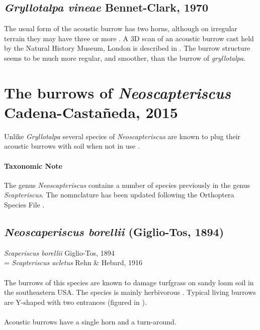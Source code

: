 \documentclass{article}
\begin{document}
   \subsection{\textit{Gryllotalpa vineae} Bennet-Clark, 1970 \cite{bennetclark1970b}}
   The usual form of the acoustic burrow has two horns, although on irregular terrain they may have three or more \cite{bennetclark1970a}. A 3D scan of an acoustic burrow cast held by the Natural History Museum, London is described in \cite{baker2016}. The burrow structure seems to be much more regular, and smoother, than the burrow of \textit{gryllotalpa}.

   \section{The burrows of \textit{Neoscapteriscus} Cadena-Castañeda, 2015}
   Unlike \textit{Gryllotalpa} several species of \textit{Neoscapteriscus} are known to plug their acoustic burrows with soil when not in use \cite{walker1990}.
   
   \paragraph{Taxonomic Note}
   The genus \textit{Neoscapteriscus} contains a number of species previously in the genus \textit{Scapteriscus}. The nomnclature has been updated following the Orthoptera Species File \cite{eades2016}.
   
   \subsection{\textit{Neoscaperiscus borellii} (Giglio-Tos, 1894) \cite{giglio-tos1894}}
   \textit{Scaperiscus borellii} Giglio-Tos, 1894\\
   = \textit{Scapteriscus acletus} Rehn \& Hebard, 1916
   \paragraph{}
   The burrows of this species are known to damage turfgrass on sandy loam soil in the  southeastern USA. The species is mainly herbivorous \cite{brandenburg2002}. Typical living  burrows are Y-shaped with two entrances (figured in \cite{brandenburg2002}).
   \paragraph{}
   Acoustic burrows have a single horn and a turn-around.
   
\end{document}
